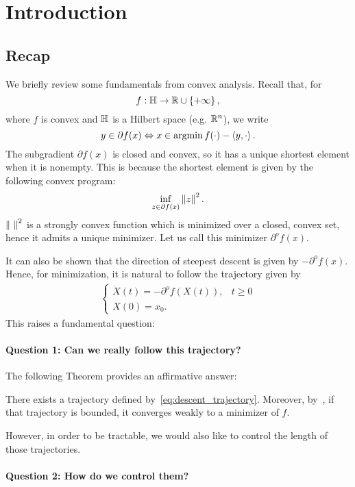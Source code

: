 \section{Introduction}

\subsection{Recap}
We briefly review some fundamentals from convex analysis. Recall that, for
\[
	f : \mathbb{H} \to \mathbb{R} \cup \left\{ +\infty \right\},
\]
where $f$ is convex and $\mathbb{H}$ is a Hilbert space (e.g. $\mathbb{R}^n$), we write
\[
	y \in \partial f(x) \Leftrightarrow x \in \operatorname*{argmin} f(\cdot) - \left\langle y, \cdot \right\rangle.
\]
The subgradient $\partial f(x)$ is closed and convex, so it has a unique
shortest element when it is nonempty. This is because the shortest element is
given by the following convex program:
\[
	\inf_{z \in \partial f(x)} \left \| z \right \|^2.
\]
$\left \| ~ \right \|^2$ is a strongly convex function which is minimized over a closed,
convex set, hence it admits a unique minimizer. Let us call this minimizer
$\partial^o f(x)$.

It can also be shown that the direction of steepest descent is given by
$-\partial^o f(x)$. Hence, for minimization, it is natural to follow the
trajectory given by
\begin{align}
	\begin{cases}
		\dot{X}(t) = -\partial^o f(X(t)), & t \geq 0 \\
		X(0) = x_0. &
	\end{cases}
	\label{eq:descent_trajectory}
\end{align}
This raises a fundamental question:

\paragraph{Question 1: Can we really follow this trajectory?}

The following Theorem provides an affirmative answer:

\begin{ctheorem}{\cite{Brezis73}}
	There exists a trajectory defined by~\cref{eq:descent_trajectory}.
	Moreover, by~\cite{Bruck75}, if that trajectory is bounded, it converges
	weakly to a minimizer of $f$.
\end{ctheorem}

However, in order to be tractable, we would also like to control the length of
those trajectories.

\paragraph{Question 2: How do we control them?}

